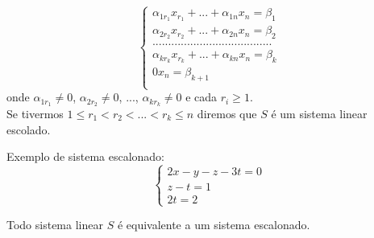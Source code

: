 \begin{equation*}
\begin{cases}
\alpha_{1r_{1}}x_{r_{1}}+...+\alpha_{1n}x_{n}=\beta_{1}\\
\alpha_{2r_{2}}x_{r_{2}}+...+\alpha_{2n}x_{n}=\beta_{2}\\
......................................\\
\alpha_{kr_{k}}x_{r_{k}}+...+\alpha_{kn}x_{n}=\beta_{k}\\
0x_{n}=\beta_{k+1}\\
\end{cases}
\end{equation*} 
onde $\alpha_{1r_{1}}\neq 0$, $\alpha_{2r_{2}}\neq 0$, ..., $\alpha_{kr_{k}}\neq 0$ e cada $r_{i}\geq 1$.\\
Se tivermos $1\leq r_{1}<r_{2}<...<r_{k}\leq n$ diremos que $S$ é um sistema linear escolado. 
\begin{ex}
	Exemplo de sistema escalonado:\\
	\begin{equation*}
	\begin{cases}
	2x-y-z-3t=0 \\
	z-t=1\\
	2t=2
	\end{cases}
	\end{equation*} 
\end{ex}
\begin{teo}
Todo sistema linear $S$ é equivalente a um sistema escalonado.	
\end{teo}
